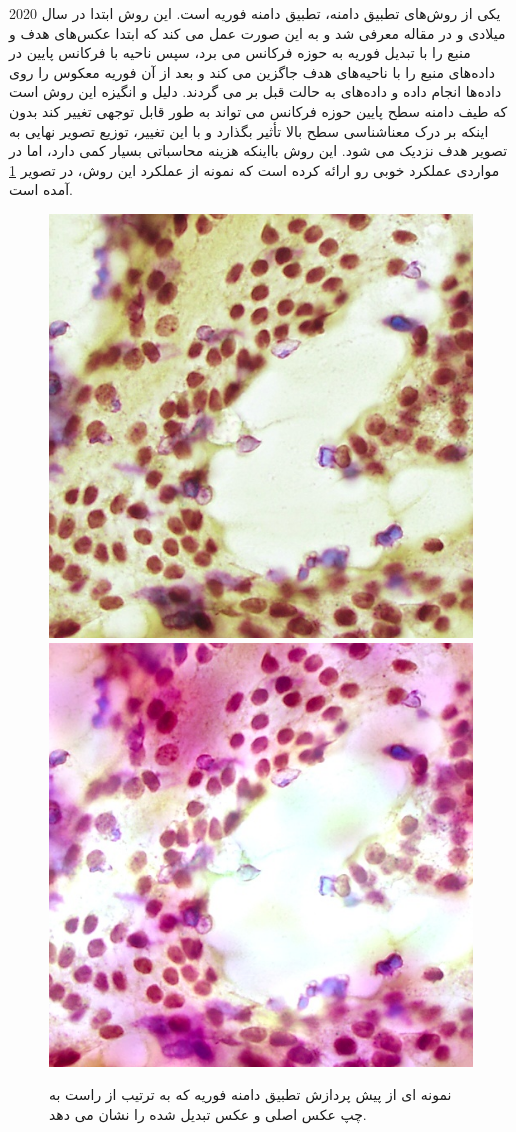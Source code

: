 یکی از روش‌های تطبیق دامنه، تطبیق دامنه فوریه است. این روش ابتدا در سال 2020 میلادی و در مقاله \cite{yang2020fda} معرفی شد و به این صورت عمل می کند که ابتدا عکس‌های هدف و منبع را با تبدیل فوریه به حوزه فرکانس می برد، سپس ناحیه با فرکانس پایین در داده‌های منبع را با ناحیه‌های هدف جاگزین می کند و بعد از آن فوریه معکوس را روی داده‌ها انجام داده و داده‌های به حالت قبل بر می گردند. دلیل و انگیزه این روش است که طیف دامنه سطح پایین حوزه فرکانس می تواند به طور قابل توجهی تغییر کند بدون اینکه بر درک معناشناسی سطح بالا تأثیر بگذارد و با این تغییر، توزیع تصویر نهایی به تصویر هدف نزدیک می شود.
این روش بااینکه هزینه محاسباتی بسیار کمی دارد، اما در مواردی عملکرد خوبی رو ارائه کرده است که نمونه از  عملکرد این روش، در تصویر \ref{fda augmentation} آمده است. 
\begin{figure}
    \begin{center}
        \includegraphics[width=0.48\linewidth]{figs/suggested_methods/subs/data_augmentation/fda_1054-original.jpeg}
        \includegraphics[width=0.48\linewidth]{figs/suggested_methods/subs/data_augmentation/fda_1054-transformed.jpeg}
    \end{center}
    \caption{نمونه ای از پیش پردازش تطبیق دامنه فوریه که به ترتیب از راست به چپ عکس اصلی و عکس تبدیل شده را نشان می دهد.}
    \label{fda augmentation}
\end{figure}

